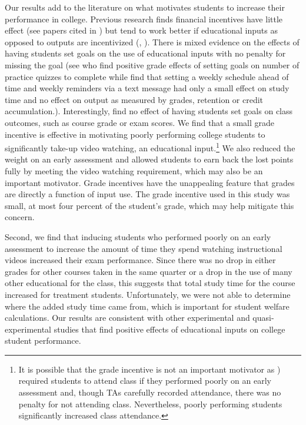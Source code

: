\documentclass[12pt]{article}
\begin{document}
Our results add to the literature on what motivates students to increase their performance in college.
Previous research finds financial incentives have little effect (see papers cited in \textcite{gmr2011}) but tend to work better if educational inputs as opposed to outputs are incentivized (\textcite{fryer2011}, \textcite{gmr2011}).
There is mixed evidence on the effects of having students set goals on the use of educational inputs with no penalty for missing the goal (see \textcite{cgpr2020} who find positive grade effects of setting goals on number of practice quizzes to complete while \textcite{oppp2019} find that setting a weekly schedule ahead of time and weekly reminders via a text message had only a small effect on study time and no effect on output as measured by grades, retention or credit accumulation.).
Interestingly, \textcite{cgpr2020} find no effect of having students set goals on class outcomes, such as course grade or exam scores.
We find that a small grade incentive is effective in motivating poorly performing college students to significantly take-up video watching, an educational input.\footnote{It is possible that the grade incentive is not an important motivator as \textcite{dgm2010}) required students to attend class if they performed poorly on an early assessment and, though TAs carefully recorded attendance, there was no penalty for not attending class. Nevertheless, poorly performing students significantly increased class attendance.} We also reduced the weight on an early assessment and allowed students to earn back the lost points fully by meeting the video watching requirement, which may also be an important motivator.
Grade incentives have the unappealing feature that grades are directly a function of input use.
The grade incentive used in this study was small, at most four percent of the student's grade, which may help mitigate this concern.

Second, we find that inducing students who performed poorly on an early assessment to increase the amount of time they spend watching instructional videos increased their exam performance.
Since there was no drop in either grades for other courses taken in the same quarter or a drop in the use of many other educational for the class, this suggests that total study time for the course increased for treatment students.
Unfortunately, we were not able to determine where the added study time came from, which is important for student welfare calculations.
Our results are consistent with other experimental and quasi-experimental studies that find positive effects of educational inputs on college student performance.
\end{document}
